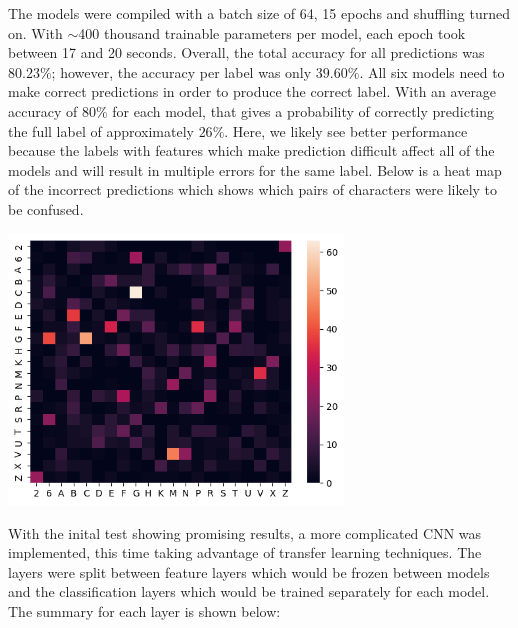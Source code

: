 \documentclass[12pt]{article}
\begin{document}
The models were compiled with a batch size of 64, 15 epochs and shuffling turned
on. With $\sim$400 thousand trainable parameters per model, each epoch took
between 17 and 20 seconds. Overall, the total accuracy for all predictions was 
$80.23\%$; however, the accuracy per label was only $39.60\%$. All six models
need to make correct predictions in order to produce the correct label. With an
average accuracy of $80\%$ for each model, that gives a probability of correctly
predicting the full label of approximately $26\%$. Here, we likely see better
performance because the labels with features which make prediction difficult
affect all of the models and will result in multiple errors for the same label.
Below is a heat map of the incorrect predictions which shows which pairs of
characters were likely to be confused. 

\begin{center}
	\includegraphics[width=3.5in]{heatmap1.png}
\end{center}

With the inital test showing promising results, a more complicated CNN was
implemented, this time taking advantage of transfer learning techniques. The
layers were split between feature layers which would be frozen between models
and the classification layers which would be trained separately for each model.
The summary for each layer is shown below:
\end{document}
